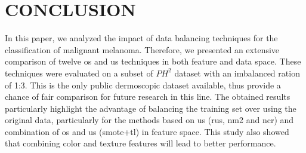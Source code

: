 \graphicspath{ {./content/Experiments-results/figures/} }

\section{\uppercase{Conclusion}}
\label{sec:cons} 

\noindent In this paper, we analyzed the impact of data balancing techniques for the classification of malignant melanoma. 
Therefore, we presented an extensive comparison of twelve \ac{os} and \ac{us} techniques in both feature and data space. 
These techniques were evaluated on a subset of $PH^{2}$ dataset with an imbalanced ration of 1:3.
{\color{red} This is the only public dermoscopic dataset available, thus provide a chance of fair comparison for future research in this line.}
The obtained results particularly highlight the advantage of balancing the training set over using the original data, particularly for the methods based on \ac{us} (\ac{rus}, \ac{nm2} and \ac{ncr}) and combination of \ac{os} and \ac{us} (\ac{smote}+\ac{tl}) in feature space.
This study also showed that combining color and texture features will lead to better performance. 




